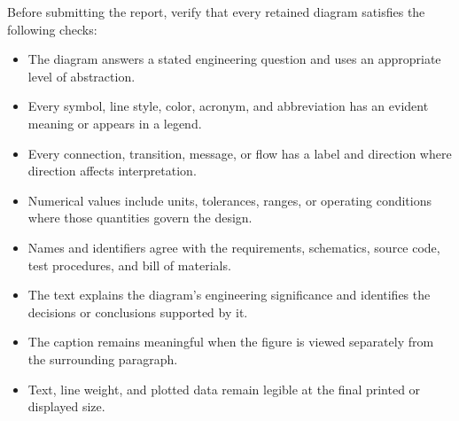 

\begin{figure}[htbp]
\centering
{}
\caption{}
\label{fig:unique-name}
\end{figure}


Before submitting the report, verify that every retained diagram satisfies the following checks:
\begin{itemize}
    \item The diagram answers a stated engineering question and uses an appropriate level of abstraction.
    \item Every symbol, line style, color, acronym, and abbreviation has an evident meaning or appears in a legend.
    \item Every connection, transition, message, or flow has a label and direction where direction affects interpretation.
    \item Numerical values include units, tolerances, ranges, or operating conditions where those quantities govern the design.
    \item Names and identifiers agree with the requirements, schematics, source code, test procedures, and bill of materials.
    \item The text explains the diagram's engineering significance and identifies the decisions or conclusions supported by it.
    \item The caption remains meaningful when the figure is viewed separately from the surrounding paragraph.
    \item Text, line weight, and plotted data remain legible at the final printed or displayed size.
\end{itemize}
